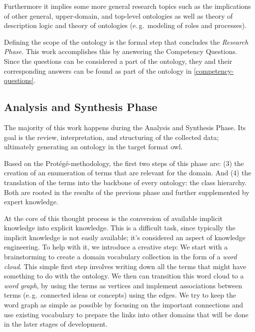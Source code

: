 \documentclass[a4paper, DIV=13, BCOR=0cm]{scrbook}
\newcommand{\eg}{e.\,g.\ }
\begin{document}
Furthermore it implies some more general research topics such as the implications of other general, upper-domain, and top-level ontologies as well as theory of description logic and theory of ontologies (\eg modeling of roles and processes).

Defining the scope of the ontology is the formal step that concludes the \textit{Research Phase}. This work accomplishes this by answering the Competency Questions. Since the questions can be considered a part of the ontology, they and their corresponding answers can be found as part of the ontology in \autoref{competency-questions}.

\subsection{Analysis and Synthesis Phase}
\label{analysis}
The majority of this work happens during the Analysis and Synthesis Phase. Its goal is the review, interpretation, and structuring of the collected data; ultimately generating an ontology in the target format \gls{owl}.

Based on the Protégé-methodology, the first two steps of this phase are: (3) the creation of an enumeration of terms that are relevant for the domain. And (4) the translation of the terms into the backbone of every ontology: the class hierarchy. Both are rooted in the results of the previous phase and further supplemented by expert knowledge.

At the core of this thought process is the conversion of available implicit knowledge into explicit knowledge. This is a difficult task, since typically the implicit knowledge is not easily available; it's considered an aspect of knowledge engineering. \cite[p.\,30--31]{moore2011towards} To help with it, we introduce a creative step: We start with a brainstorming to create a domain vocabulary collection in the form of a \textit{word cloud}. This simple first step involves writing down all the terms that might have something to do with the ontology. We then can transition this word cloud to a \textit{word graph}, by using the terms as vertices and implement associations between terms (\eg connected ideas or concepts) using the edges. We try to keep the word graph as simple as possible by focusing on the important connections and use existing vocabulary to prepare the links into other domains that will be done in the later stages of development.
\end{document}
